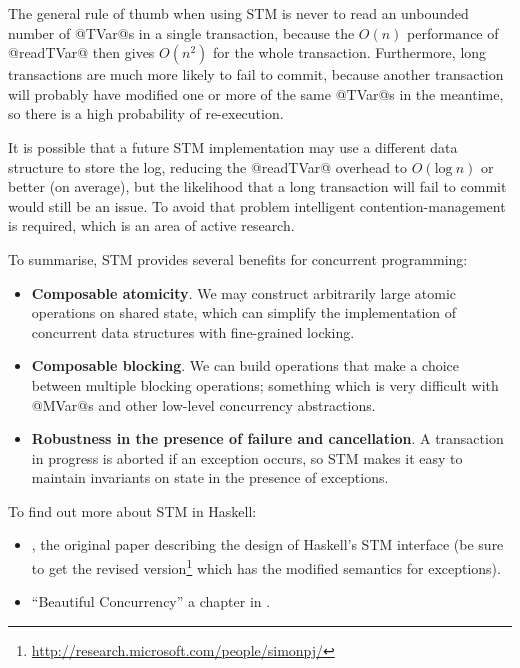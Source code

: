 The general rule of thumb when using STM is never to read an unbounded
number of @TVar@s in a single transaction, because the $O(n)$
performance of @readTVar@ then gives $O(n^2)$ for the whole
transaction.  Furthermore, long transactions are much more likely to
fail to commit, because another transaction will probably have
modified one or more of the same @TVar@s in the meantime, so there is
a high probability of re-execution.

It is possible that a future STM implementation may use a different
data structure to store the log, reducing the @readTVar@ overhead to
$O(\mbox{log}~n)$ or better (on average), but the likelihood that a
long transaction will fail to commit would still be an issue.  To
avoid that problem intelligent contention-management is required,
which is an area of active research.


To summarise, STM provides several benefits for concurrent
programming:

\begin{itemize}
\item \textbf{Composable atomicity}.  We may construct arbitrarily large atomic
  operations on shared state, which can simplify the implementation of
  concurrent data structures with fine-grained locking.
\item \textbf{Composable blocking}.  We can build operations that make
  a choice between multiple blocking operations; something which is
  very difficult with @MVar@s and other low-level concurrency
  abstractions.
\item \textbf{Robustness in the presence of failure and cancellation}.
  A transaction in progress is aborted if an exception occurs, so STM
  makes it easy to maintain invariants on state in the presence of
  exceptions.
\end{itemize}


To find out more about STM in Haskell:

\begin{itemize}
\item \citet{stm}, the original paper describing the design of
  Haskell's STM interface (be sure to get the revised
  version\footnote{\url{http://research.microsoft.com/people/simonpj/}}
  which has the modified semantics for exceptions).
\item ``Beautiful Concurrency'' a chapter in \citet{beautiful-code}.
\end{itemize}


